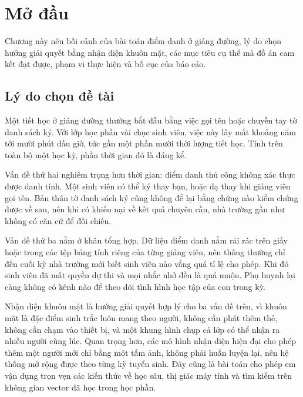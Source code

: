 \chapter{Mở đầu}
\label{ch:modau}

\begin{muctieu}
Chương này nêu bối cảnh của bài toán điểm danh ở giảng đường, lý do chọn
hướng giải quyết bằng nhận diện khuôn mặt, các mục tiêu cụ thể mà đồ án cam
kết đạt được, phạm vi thực hiện và bố cục của báo cáo.
\end{muctieu}

\section{Lý do chọn đề tài}

Một tiết học ở giảng đường thường bắt đầu bằng việc gọi tên hoặc chuyền tay
tờ danh sách ký. Với lớp học phần vài chục sinh viên, việc này lấy mất
khoảng năm tới mười phút đầu giờ, tức gần một phần mười thời lượng tiết học.
Tính trên toàn bộ một học kỳ, phần thời gian đó là đáng kể.

Vấn đề thứ hai nghiêm trọng hơn thời gian: điểm danh thủ công không xác thực
được danh tính. Một sinh viên có thể ký thay bạn, hoặc dạ thay khi giảng viên
gọi tên. Bản thân tờ danh sách ký cũng không để lại bằng chứng nào kiểm chứng
được về sau, nên khi có khiếu nại về kết quả chuyên cần, nhà trường gần như
không có căn cứ để đối chiếu.

Vấn đề thứ ba nằm ở khâu tổng hợp. Dữ liệu điểm danh nằm rải rác trên giấy
hoặc trong các tệp bảng tính riêng của từng giảng viên, nên thông thường chỉ
đến cuối kỳ nhà trường mới biết sinh viên nào vắng quá tỉ lệ cho phép. Khi
đó sinh viên đã mất quyền dự thi và mọi nhắc nhở đều là quá muộn. Phụ huynh
lại càng không có kênh nào để theo dõi tình hình học tập của con trong kỳ.

Nhận diện khuôn mặt là hướng giải quyết hợp lý cho ba vấn đề trên, vì khuôn
mặt là đặc điểm sinh trắc luôn mang theo người, không cần phát thêm thẻ,
không cần chạm vào thiết bị, và một khung hình chụp cả lớp có thể nhận ra
nhiều người cùng lúc. Quan trọng hơn, các mô hình nhận diện hiện đại \cite{Wang2021Survey} cho
phép thêm một người mới chỉ bằng một tấm ảnh, không phải huấn luyện lại, nên
hệ thống mở rộng được theo từng kỳ tuyển sinh. Đây cũng là bài toán cho phép
em vận dụng trọn vẹn các kiến thức về học sâu, thị giác máy tính và tìm kiếm
trên không gian vector đã học trong học phần.

